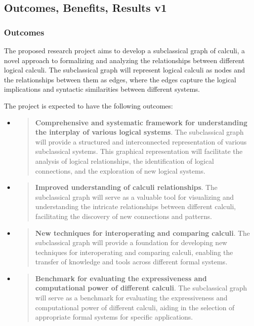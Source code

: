 \hypertarget{outcomes-benefits-results-v1}{%
\subsection{Outcomes, Benefits, Results
v1}\label{outcomes-benefits-results-v1}}

\hypertarget{outcomes}{%
\subsubsection{Outcomes}\label{outcomes}}

The proposed research project aims to develop a subclassical graph of
calculi, a novel approach to formalizing and analyzing the relationships
between different logical calculi. The subclassical graph will represent
logical calculi as nodes and the relationships between them as edges,
where the edges capture the logical implications and syntactic
similarities between different systems.

The project is expected to have the following outcomes:

\begin{itemize}
\item
  \begin{quote}
  \textbf{Comprehensive and systematic framework for understanding the
  interplay of various logical systems}. The subclassical graph will
  provide a structured and interconnected representation of various
  subclassical systems. This graphical representation will facilitate
  the analysis of logical relationships, the identification of logical
  connections, and the exploration of new logical systems.
  \end{quote}
\item
  \begin{quote}
  \textbf{Improved understanding of calculi relationships}. The
  subclassical graph will serve as a valuable tool for visualizing and
  understanding the intricate relationships between different calculi,
  facilitating the discovery of new connections and patterns.
  \end{quote}
\item
  \begin{quote}
  \textbf{New techniques for interoperating and comparing calculi}. The
  subclassical graph will provide a foundation for developing new
  techniques for interoperating and comparing calculi, enabling the
  transfer of knowledge and tools across different formal systems.
  \end{quote}
\item
  \begin{quote}
  \textbf{Benchmark for evaluating the expressiveness and computational
  power of different calculi}. The subclassical graph will serve as a
  benchmark for evaluating the expressiveness and computational power of
  different calculi, aiding in the selection of appropriate formal
  systems for specific applications.
  \end{quote}
\end{itemize}

